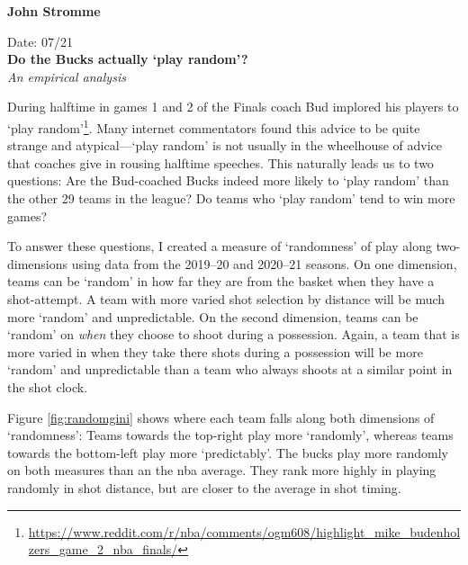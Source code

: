 \documentclass[a4paper, 11pt]{article}
\begin{document}

\normalsize  \strut\hfill \textbf{John Stromme} \\
\normalsize  \strut\hfill  Date: 07/21 \\

\noindent
\huge \textbf{Do the Bucks actually `play random'?} \\
\textit{An empirical analysis} \\

\normalsize

During halftime in games 1 and 2 of the Finals coach Bud implored his players to `play random'\footnote{\url{https://www.reddit.com/r/nba/comments/ogm608/highlight_mike_budenholzers_game_2_nba_finals/}}. Many internet commentators found this advice to be quite strange and atypical---`play random' is not usually in the wheelhouse of advice that coaches give in rousing halftime speeches. This naturally leads us to two questions: Are the Bud-coached Bucks indeed more likely to `play random' than the other 29 teams in the league? Do teams who `play random' tend to win more games?

To answer these questions, I created a measure of `randomness' of play along two-dimensions using data from the 2019--20 and 2020--21 seasons. On one dimension, teams can be `random' in how far they are from the basket when they have a shot-attempt. A team with more varied shot selection by distance will be much more `random' and unpredictable. On the second dimension, teams can be `random' on \textit{when} they choose to shoot during a possession. Again, a team that is more varied in when they take there shots during a possession will be more `random' and unpredictable than a team who always shoots at a similar point in the shot clock.

Figure \ref{fig:randomgini} shows where each team falls along both dimensions of `randomness': Teams towards the top-right play more `randomly', whereas teams towards the bottom-left play more `predictably'. The bucks play more randomly on both measures than an the nba average. They rank more highly in playing randomly in shot distance, but are closer to the average in shot timing.
\end{document}
